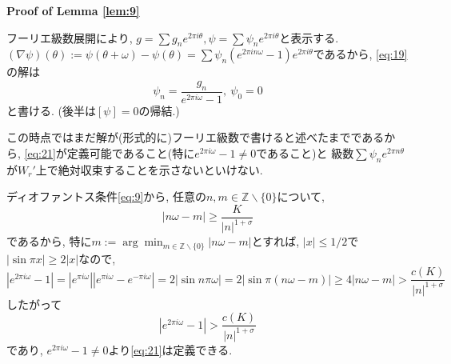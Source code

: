 \documentclass[a4paper]{ujarticle}
\makeatletter
\numberwithin{equation}{section}
\theoremstyle{definition}
\renewenvironment{proof}[1][Proof]{\par
  \pushQED{\qed}%
  \normalfont \topsep6\p@\@plus6\p@\relax
  \trivlist
  \item\relax
  {\bfseries
  #1\@addpunct{.}}\hspace\labelsep\ignorespaces
}{%
  \popQED\endtrivlist\@endpefalse
}
\makeatother
\begin{document}
        \begin{proof}[Proof of Lemma \ref{lem:9}]
            フーリエ級数展開により, $\displaystyle g = \sum g_n e^{2 \pi i \theta}, \psi = \sum \psi_n e^{2 \pi i \theta}$と表示する.\\
            $(\nabla \psi)(\theta) := \psi(\theta + \omega) - \psi(\theta) = \sum \psi_n (e^{2 \pi i n \omega} - 1) e^{2 \pi i \theta}$であるから, 
            \eqref{eq:19}の解は
            \begin{equation} \label{eq:21}
                \psi_n = \frac{g_n}{e^{2 \pi i \omega} - 1}, \ \psi_0 = 0
            \end{equation}
            と書ける. (後半は$[\psi] = 0$の帰結.)
            
            この時点ではまだ解が(形式的に)フーリエ級数で書けると述べたまでであるから, 
            \eqref{eq:21}が定義可能であること(特に$e^{2 \pi i \omega} - 1 \neq 0$であること)と
            級数$\sum \psi_n e^{2 \pi n \theta}$が$W_r'$上で絶対収束することを示さないといけない.

            ディオファントス条件\eqref{eq:9}から, 任意の$n, m \in \mathbb{Z} \backslash \{0\}$について,
            \[
                |n \omega - m| \geq \frac{K}{|n|^{1 + \sigma}}
            \]
            であるから, 特に$\displaystyle m := \arg \min_{m \in \mathbb{Z} \backslash \{0\}}|n \omega - m|$とすれば, $|x| \leq 1/2$で$|\sin{\pi x}| \geq 2|x|$なので, 
            \[
                |e^{2 \pi i \omega} - 1| = |e^{\pi i \omega}| |e^{\pi i \omega} - e^{- \pi i \omega}| = 2 |\sin{n \pi \omega}| = 2 |\sin{\pi (n \omega - m)}| \geq 4 |n \omega - m| > \frac{c(K)}{|n|^{1 + \sigma}}
            \]
            したがって 
            \begin{equation} \label{eq:22}
                |e^{2 \pi i \omega} - 1| > \frac{c(K)}{|n|^{1 + \sigma}} 
            \end{equation}
            であり, $e^{2 \pi i \omega} - 1 \neq 0$より\eqref{eq:21}は定義できる.


\end{proof}
\end{document}
